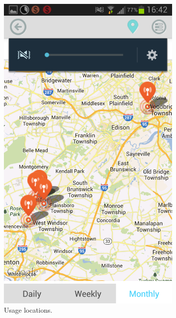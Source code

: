 \begin{figure}
\begin{subfigure}[b]{0.23\textwidth}
	\includegraphics[width = \textwidth]{Figures/Maps.png}
	\caption{Usage locations.}
	\label{fig:datawiz_predict}
	\end{subfigure}
	\begin{subfigure}[b]{0.23\textwidth}

\end{subfigure}
\end{figure}
